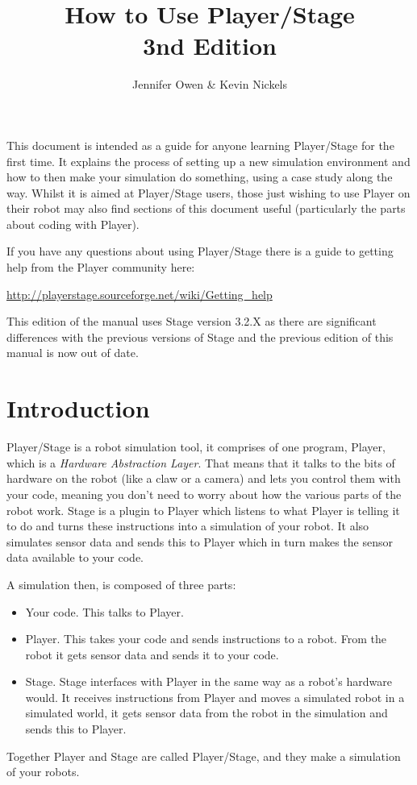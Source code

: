 \documentclass[a4paper]{report}
\title{How to Use Player/Stage\\ 3nd Edition}
\author{Jennifer Owen \& Kevin Nickels}
\newcommand{\plst}{Player/Stage\xspace}
\newcommand{\pl}{Player\xspace}
\begin{document}
\maketitle

This document is intended as a guide for anyone learning \plst for the first time. It explains the process of setting up a new simulation environment and how to then make your simulation do something, using a case study along the way. Whilst it is aimed at \plst users, those just wishing to use \pl on their robot may also find sections of this document useful (particularly the parts about coding with Player).

If you have any questions about using \plst there is a guide to getting help from the \pl community here:
\begin{center}
	\url{http://playerstage.sourceforge.net/wiki/Getting_help}
\end{center}
This edition of the manual uses Stage version 3.2.X as there are significant differences with the previous versions of Stage and the previous edition of this manual is now out of date. 

\tableofcontents


\chapter{Introduction}\label{sec:Introduction}
\plst is a robot simulation tool, it comprises of one program, \pl, which is a \emph{Hardware Abstraction Layer}. That means that it talks to the bits of hardware on the robot (like a claw or a camera) and lets you control them with your code, meaning you don't need to worry about how the various parts of the robot work. Stage is a plugin to \pl which listens to what \pl is telling it to do and turns these instructions into a simulation of your robot. It also simulates sensor data and sends this to \pl which in turn makes the sensor data available to your code.

A simulation then, is composed of three parts:
\begin{itemize}
\item Your code. This talks to \pl.
\item \pl. This takes your code and sends instructions to a robot. From the robot it gets sensor data and sends it to your code.
\item Stage. Stage interfaces with \pl in the same way as a robot's hardware would. It receives instructions from \pl and moves a simulated robot in a simulated world, it gets sensor data from the robot in the simulation and sends this to \pl.
\end{itemize}
Together \pl and Stage are called \plst, and they make a simulation of your robots.
\end{document}
